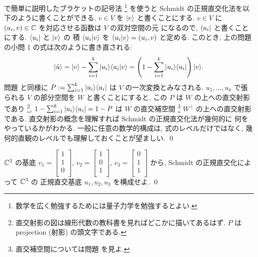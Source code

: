 \documentclass[12pt,twoside]{jarticle}
\begin{document}
\begin{rem}
   で簡単に説明したブラケットの記号法%
  \footnote{数学を広く勉強するためには量子力学を勉強するとよい.}
  を使うと Schmidt の正規直交化法を以下のように書くことができる.
  $v\in V$ を $|v\rangle$ と書くことにする.
  $v\in V$ に $(u_i,v)\in{\mathbb C}$ を対応させる函数は $V$ の双対空間の元
  になるので, $\langle u_i|$ と書くことにする. $\langle u_i|$ と $|v\rangle$ の
  積 $\langle u_i|v\rangle$ を $\langle u_i|v\rangle = (u_i,v)$ と定める. 
  このとき, 上の問題の小問 1 の式は次のように書き直される:
  \begin{equation*}
    |\tilde{u}\rangle 
    = |v\rangle - \sum_{i=1}^k |u_i\rangle\langle u_i|v\rangle
    = \left(1 - \sum_{i=1}^k |u_i\rangle\langle u_i|\right)|v\rangle.
  \end{equation*}
  問題  と同様に $P:=\sum_{i=1}^k |u_i\rangle\langle u_i|$ 
  は $V$ の一次変換とみなされる.
  $u_1,\ldots,u_k$ で張られる $V$ の部分空間を $W$ と書くことにすると,
  この $P$ は $W$ の上への直交射影であり%
  \footnote{直交射影の図は線形代数の教科書を見ればどこかに描いてあるはず.
    $P$ は projection (射影) の頭文字である.},
  $1-\sum_{i=1}^k |u_i\rangle\langle u_i| = 1 - P$ 
  は $W$ の直交補空間%
  \footnote{直交補空間については問題  を見よ.} %
  $W^\bot$ の上への直交射影である.  
  直交射影の概念を理解すれば Schmidt の正規直交化法が幾何的に
  何をやっているかがわかる.  一般に任意の数学的構成は, 
  式のレベルだけではなく, 幾何的直観のレベルでも理解しておくことが望ましい.
  \qed
\end{rem}


\begin{question}
  \label{q:schmidt-1}
  ${\mathbb C}^3$ の基底 %
  $v_1=
  \begin{bmatrix}
    1 \\ 1 \\ 0 \\
  \end{bmatrix}$, 
  $v_2=
  \begin{bmatrix}
    1 \\ 0 \\ 1 \\
  \end{bmatrix}$, 
  $v_3=
  \begin{bmatrix}
    0 \\ 1 \\ 1 \\
  \end{bmatrix}$ から, Schmidt の正規直交化によって ${\mathbb C}^3$ の
  正規直交基底 $u_1,u_2,u_3$ を構成せよ. \qed
\end{question}
\end{document}

